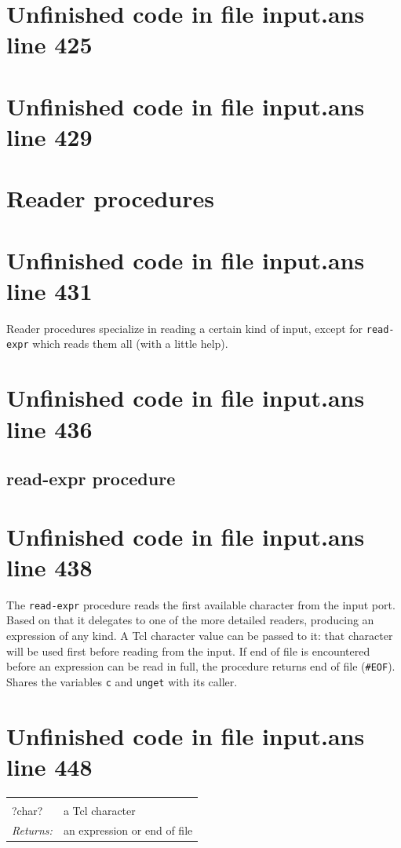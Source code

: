 \documentclass[twoside,9pt]{report}
\begin{document}
\section{Unfinished code in file input.ans line 425}
\section{Unfinished code in file input.ans line 429}
\section{Reader procedures}
\label{reader-procedures}
\section{Unfinished code in file input.ans line 431}


Reader procedures specialize in reading a certain kind of input, except for \texttt{read-expr} which reads them all (with a little help).

\section{Unfinished code in file input.ans line 436}
\subsection{read-expr procedure}
\label{read-expr-procedure}
\section{Unfinished code in file input.ans line 438}


The \texttt{read-expr} procedure reads the first available character from the input port. Based on that it delegates to one of the more detailed readers, producing an expression of any kind. A Tcl character value can be passed to it: that character will be used first before reading from the input. If end of file is encountered before an expression can be read in full, the procedure returns end of file (\texttt{\#EOF}). Shares the variables \texttt{c} and \texttt{unget} with its caller.

\section{Unfinished code in file input.ans line 448}
\noindent\begin{tabular}{ |p{1.9cm} p{8cm}| }
\hline
\rowcolor[HTML]{CCCCCC} \multicolumn{2}{|l|}{\bf read-expr (internal)} \\
?char? & a Tcl character \\
\textit{Returns:} & an expression or end of file \\
\hline
\end{tabular}
\end{document}
